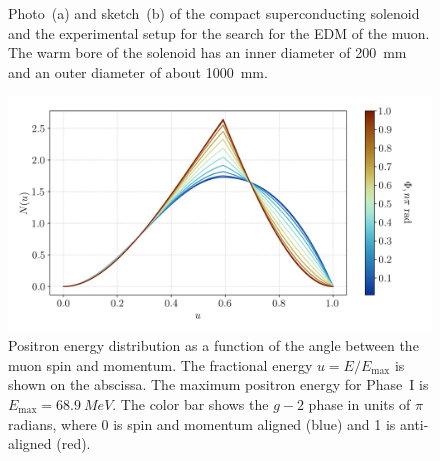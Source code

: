 \begin{refsection}
    \begin{figure}%
    \centering
        \hfill
        \caption{Photo~(a) and sketch~(b) of the compact superconducting solenoid and the experimental setup for the search for the EDM of the muon. The warm bore of the solenoid has an inner diameter of \SI{200}{mm} and an outer diameter of about \SI{1000}{mm}.}%
    \label{fig:PhaseISetup}%
    \end{figure}

\begin{figure}
\centering
\includegraphics[width=0.66\columnwidth]{Figures/muEDM/n_vs_phi.png}
\caption{Positron energy distribution as a function of the angle between the muon spin and momentum. The fractional energy $u = E/E_\text{max}$ is shown on the abscissa. The maximum positron energy for Phase~I is $E_\text{max} = \SI{68.9}{MeV}$. The color bar shows the $g-2$ phase in units of $\pi$ radians, where 0 is spin and momentum aligned (blue) and 1 is anti-aligned (red).
}%
\label{fig:n_vs_phi}
\end{figure}


\end{refsection}
